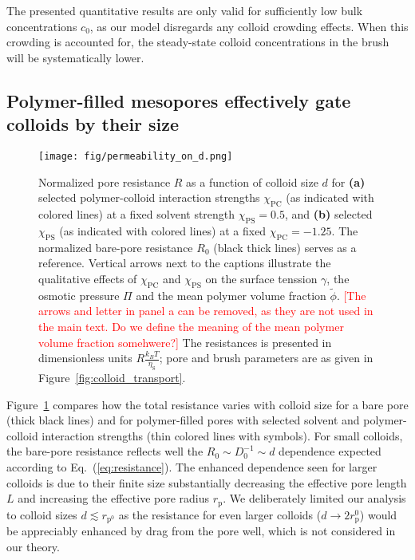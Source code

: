 \documentclass[12pt, a4paper]{article}
\newcommand\todo[1]{\textcolor{red}{#1}}
\begin{document}
The presented quantitative results are only valid for sufficiently low bulk concentrations $c_0$, as our model disregards any colloid crowding effects.
When this crowding is accounted for, the steady-state colloid concentrations in the brush will be systematically lower.


\subsection{Polymer-filled mesopores effectively gate colloids by their size}

\begin{figure}
    \centering
    \texttt{[image: fig/permeability\_on\_d.png]}
    \caption{
    Normalized pore resistance $R$ as a function of colloid size $d$ for \textbf{(a)} selected polymer-colloid interaction strengths $\chi_{\text{PC}}$ (as indicated with colored lines) at a fixed solvent strength $\chi_{\text{PS}} =0.5$, and \textbf{(b)} selected $\chi_{\text{PS}}$ (as indicated with colored lines) at a fixed $\chi_{\text{PC}} = -1.25$. 
    The normalized bare-pore resistance $R_{0}$ (black thick lines) serves as a reference.
    Vertical arrows next to the captions illustrate the qualitative effects of $\chi_{\text{PC}}$ and $\chi_{\text{PS}}$ on the surface tenssion $\gamma$, the osmotic pressure $\Pi$ and the mean polymer volume fraction $\tilde{\phi}$. 
    \todo{[The arrows and letter in panel a can be removed, as they are not used in the main text. Do we define the meaning of the mean polymer volume fraction somehwere?]} 
    The resistances is presented in dimensionless units $R\tfrac{k_{B}T}{\eta_{\text{S}}}$; pore and brush parameters are as given in Figure~\ref{fig:colloid_transport}. 
    }
    \label{fig:R_vs_d}
\end{figure}

Figure~\ref{fig:R_vs_d} compares how the total resistance varies with colloid size for a bare pore (thick black lines) and for polymer-filled pores with selected solvent and polymer-colloid interaction strengths (thin colored lines with symbols).
For small colloids, the bare-pore resistance reflects well the $R_0 \sim D_0^{-1} \sim d$ dependence expected according to Eq.~(\ref{eq:resistance}).
The enhanced dependence seen for larger colloids is due to their finite size substantially decreasing the effective pore length $L$ and increasing the effective pore radius $r_{\text{p}}$.
We deliberately limited our analysis to colloid sizes $d \lesssim r_{\text{p}^0}$ as the resistance for even larger colloids ($d \rightarrow 2r_{\text{p}}^0$) would be appreciably enhanced by drag from the pore well, which is not considered in our theory.
\end{document}
